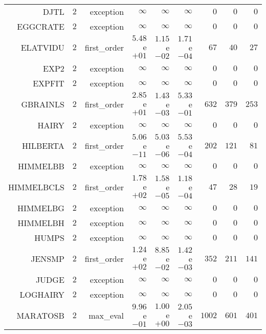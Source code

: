 \begin{longtable}{rrrrrrrrr}
DJTL & \(     2\) & exception & \(\infty\) & \(\infty\) & \(\infty\) & \(     0\) & \(     0\) & \(     0\) \\
EGGCRATE & \(     2\) & exception & \(\infty\) & \(\infty\) & \(\infty\) & \(     0\) & \(     0\) & \(     0\) \\
ELATVIDU & \(     2\) & first\_order & \( 5.48\)e\(+01\) & \( 1.15\)e\(-02\) & \( 1.71\)e\(-04\) & \(    67\) & \(    40\) & \(    27\) \\
EXP2 & \(     2\) & exception & \(\infty\) & \(\infty\) & \(\infty\) & \(     0\) & \(     0\) & \(     0\) \\
EXPFIT & \(     2\) & exception & \(\infty\) & \(\infty\) & \(\infty\) & \(     0\) & \(     0\) & \(     0\) \\
GBRAINLS & \(     2\) & first\_order & \( 2.85\)e\(+01\) & \( 1.43\)e\(-03\) & \( 5.33\)e\(-01\) & \(   632\) & \(   379\) & \(   253\) \\
HAIRY & \(     2\) & exception & \(\infty\) & \(\infty\) & \(\infty\) & \(     0\) & \(     0\) & \(     0\) \\
HILBERTA & \(     2\) & first\_order & \( 5.06\)e\(-11\) & \( 5.03\)e\(-06\) & \( 5.53\)e\(-04\) & \(   202\) & \(   121\) & \(    81\) \\
HIMMELBB & \(     2\) & exception & \(\infty\) & \(\infty\) & \(\infty\) & \(     0\) & \(     0\) & \(     0\) \\
HIMMELBCLS & \(     2\) & first\_order & \( 1.78\)e\(+02\) & \( 1.58\)e\(-05\) & \( 1.18\)e\(-04\) & \(    47\) & \(    28\) & \(    19\) \\
HIMMELBG & \(     2\) & exception & \(\infty\) & \(\infty\) & \(\infty\) & \(     0\) & \(     0\) & \(     0\) \\
HIMMELBH & \(     2\) & exception & \(\infty\) & \(\infty\) & \(\infty\) & \(     0\) & \(     0\) & \(     0\) \\
HUMPS & \(     2\) & exception & \(\infty\) & \(\infty\) & \(\infty\) & \(     0\) & \(     0\) & \(     0\) \\
JENSMP & \(     2\) & first\_order & \( 1.24\)e\(+02\) & \( 8.85\)e\(-02\) & \( 1.42\)e\(-03\) & \(   352\) & \(   211\) & \(   141\) \\
JUDGE & \(     2\) & exception & \(\infty\) & \(\infty\) & \(\infty\) & \(     0\) & \(     0\) & \(     0\) \\
LOGHAIRY & \(     2\) & exception & \(\infty\) & \(\infty\) & \(\infty\) & \(     0\) & \(     0\) & \(     0\) \\
MARATOSB & \(     2\) & max\_eval & \( 9.96\)e\(-01\) & \( 1.00\)e\(+00\) & \( 2.05\)e\(-03\) & \(  1002\) & \(   601\) & \(   401\) \\

\end{longtable}
